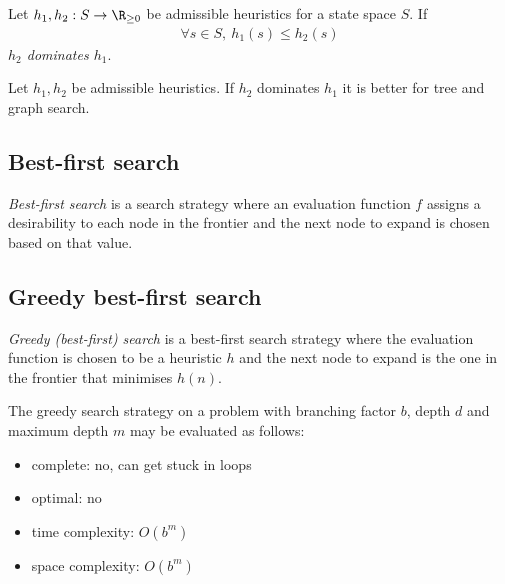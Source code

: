 \documentclass{article}
\begin{document}
\begin{definition}
    Let $h_1,h_2:S\to \R_{\geq 0}$ be admissible heuristics for a state
    space $S$. If
    \begin{align*}
        \forall s\in S,\: h_1(s) \leq h_2(s) 
    \end{align*}
    \emph{$h_2$ dominates $h_1$}.
\end{definition}

\begin{theorem}
    Let $h_1,h_2$ be admissible heuristics. If $h_2$ dominates $h_1$ it is
    better for tree and graph search.
\end{theorem}

\subsection{Best-first search}

\begin{definition}
    \emph{Best-first search} is a search strategy where an evaluation function
    $f$ assigns a desirability to each node in the frontier and the next node
    to expand is chosen based on that value.
\end{definition}

\subsection{Greedy best-first search}

\begin{definition}
    \emph{Greedy (best-first) search} is a best-first search strategy where the
    evaluation function is chosen to be a heuristic $h$ and the next node to
    expand is the one in the frontier that minimises $h(n)$.
\end{definition}

\begin{theorem}
    The greedy search strategy on a problem with branching factor $b$, depth
    $d$ and maximum depth $m$ may be evaluated as follows:
    \begin{itemize}
        \item complete: no, can get stuck in loops
        \item optimal: no
        \item time complexity: $O(b^m)$
        \item space complexity: $O(b^m)$
    \end{itemize}
\end{theorem}
\end{document}
